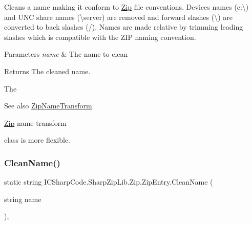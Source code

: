 Cleans a name making it conform to \hyperlink{namespace_i_c_sharp_code_1_1_sharp_zip_lib_1_1_zip}{Zip} file conventions. Devices names (\textquotesingle{}c\+:\textbackslash{}\textquotesingle{}) and U\+NC share names (\textquotesingle{}\textbackslash{}server\textquotesingle{}) are removed and forward slashes (\textquotesingle{}\textbackslash{}\textquotesingle{}) are converted to back slashes (\textquotesingle{}/\textquotesingle{}). Names are made relative by trimming leading slashes which is compatible with the Z\+IP naming convention. 


\begin{DoxyParams}{Parameters}
{\em name} & The name to clean\\
\hline
\end{DoxyParams}
\begin{DoxyReturn}{Returns}
The \textquotesingle{}cleaned\textquotesingle{} name.
\end{DoxyReturn}


The \begin{DoxySeeAlso}{See also}
\hyperlink{class_i_c_sharp_code_1_1_sharp_zip_lib_1_1_zip_1_1_zip_name_transform}{Zip\+Name\+Transform}


\end{DoxySeeAlso}
\hyperlink{namespace_i_c_sharp_code_1_1_sharp_zip_lib_1_1_zip}{Zip} name transform

class is more flexible. \mbox{\label{class_i_c_sharp_code_1_1_sharp_zip_lib_1_1_zip_1_1_zip_entry_a1eb0c6159ce91d0303ab617c109b6b0d}} 
\subsubsection{\texorpdfstring{Clean\+Name()}{CleanName()}\hspace{0.1cm}{\footnotesize\ttfamily [2/2]}}
{\footnotesize\ttfamily static string I\+C\+Sharp\+Code.\+Sharp\+Zip\+Lib.\+Zip.\+Zip\+Entry.\+Clean\+Name (\begin{DoxyParamCaption}\item[{string}]{name }\end{DoxyParamCaption})\hspace{0.3cm}{\ttfamily [inline]}, {\ttfamily [static]}}



